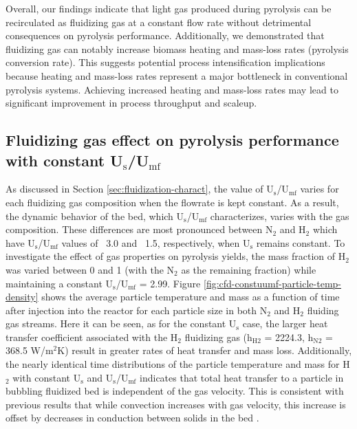 Overall, our findings indicate that light gas produced during pyrolysis can be recirculated as fluidizing gas at a constant flow rate without detrimental consequences on pyrolysis performance. Additionally, we demonstrated that fluidizing gas can notably increase biomass heating and mass-loss rates (pyrolysis conversion rate). This suggests potential process intensification implications because heating and mass-loss rates represent a major bottleneck in conventional pyrolysis systems. Achieving increased heating and mass-loss rates may lead to significant improvement in process throughput and scaleup.

\subsection{Fluidizing gas effect on pyrolysis performance with constant \texorpdfstring{U$_\text{s}$/U$_\text{mf}$}{Us/Umf}}

As discussed in Section \ref{sec:fluidization-charact}, the value of U$_\text{s}$/U$_\text{mf}$ varies for each fluidizing gas composition when the flowrate is kept constant. As a result, the dynamic behavior of the bed, which U$_\text{s}$/U$_\text{mf}$ characterizes, varies with the gas composition. These differences are most pronounced between N$_2$ and H$_2$ which have U$_\text{s}$/U$_\text{mf}$ values of ~3.0 and ~1.5, respectively, when U$_\text{s}$ remains constant. To investigate the effect of gas properties on pyrolysis yields, the mass fraction of H$_2$ was varied between 0 and 1 (with the N$_2$ as the remaining fraction) while maintaining a constant U$_\text{s}$/U$_\text{mf}$ = 2.99. Figure \ref{fig:cfd-constuumf-particle-temp-density} shows the average particle temperature and mass as a function of time after injection into the reactor for each particle size in both N$_{2}$ and H$_{2}$ fluiding gas streams. Here it can be seen, as for the constant U$_\text{s}$ case, the larger heat transfer coefficient associated with the H$_2$ fluidizing gas (h$_\text{H2}$ = 2224.3, h$_\text{N2}$ = 368.5 W/m$^2$K) result in greater rates of heat transfer and mass loss. Additionally, the nearly identical time distributions of the particle temperature and mass for H$_2$ with constant U$_\text{s}$ and U$_\text{s}$/U$_\text{mf}$ indicates that total heat transfer to a particle in bubbling fluidized bed is independent of the gas velocity. This is consistent with previous results that while convection increases with gas velocity, this increase is offset by decreases in conduction between solids in the bed \cite{Collier-2004,zhou2009particle}.

